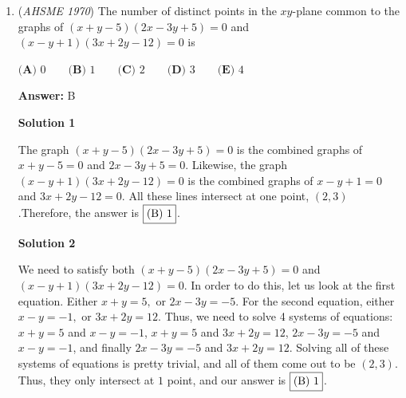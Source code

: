 \begin{enumerate}
 $\textbf{(A) }6W\qquad \textbf{(B) }6[W]\qquad \textbf{(C) }6([W]-1)\qquad \textbf{(D) }6([W]+1)\qquad  \textbf{(E) }-6[-W]$

 \textbf{Answer: }E



\textbf{Solution}

This question is trying to convert the floor function, which is more commonly notated as $\lfloor x \rfloor$, into the ceiling function, which is $\lceil x \rceil$.  The identity is $\lceil x \rceil = -\lfloor -x \rfloor$, which can be verified graphically, or proven using the definition of floor and ceiling functions.

 However, for this problem, some test values will eliminate answers.  If $W = 2.5$ ounces, the cost will be $18$ cents.  Plugging in $W = 2.5$ into the five options gives answers of $15, 12, 6, 18, 18$.  This leaves options $D$ and $E$ as viable.  If $W = 2$ ounces, the cost is $12$ cents.  Option $D$ remains $18$ cents, while option $E$ gives $12$ cents, the correct answer.  Thus, the answer is $\fbox{E}$.

 


	\item (\textit{AHSME 1970}) The number of distinct points in the $xy$-plane common to the graphs of $(x+y-5)(2x-3y+5)=0$ and $(x-y+1)(3x+2y-12)=0$ is


 $\textbf{(A) }0\qquad \textbf{(B) }1\qquad \textbf{(C) }2\qquad \textbf{(D) }3\qquad  \textbf{(E) }4$

 \textbf{Answer: }B



\textbf{Solution 1}

The graph $(x + y - 5)(2x - 3y + 5) = 0$ is the combined graphs of $x + y - 5=0$ and $2x - 3y + 5 = 0$. Likewise, the graph $(x -y + 1)(3x + 2y - 12) = 0$ is the combined graphs of $x-y+1=0$ and $3x+2y-12=0$. All these lines intersect at one point, $(2,3)$.Therefore, the answer is $\fbox{(B) 1}$.

 



\textbf{Solution 2}

We need to satisfy both $(x+y-5)(2x-3y+5)=0$ and $(x-y+1)(3x+2y-12)=0$. In order to do this, let us look at the first equation. Either $x+y=5,$ or $2x-3y=-5.$ For the second equation, either $x-y=-1,$ or $3x+2y=12.$ Thus, we need to solve 4 systems of equations: $x+y=5$ and $x-y=-1$, $x+y=5$ and $3x+2y=12$, $2x-3y=-5$ and $x-y=-1$, and finally $2x-3y=-5$ and $3x+2y=12.$ Solving all of these systems of equations is pretty trivial, and all of them come out to be $(2,3).$ Thus, they only intersect at $1$ point, and our answer is $\fbox{(B) 1}$.


\end{enumerate}
